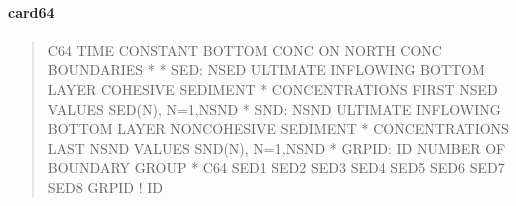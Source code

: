 \documentclass[letterpaper,10pt,english]{sphinxmanual}
\begin{document}
\paragraph{card64}
\label{\detokenize{inputfiles/runcontrol/card64:card64}}\label{\detokenize{inputfiles/runcontrol/card64::doc}}\begin{quote}

\begin{sphinxVerbatim}[commandchars=\\\{\}]
\PYGZhy{}\PYGZhy{}\PYGZhy{}\PYGZhy{}\PYGZhy{}\PYGZhy{}\PYGZhy{}\PYGZhy{}\PYGZhy{}\PYGZhy{}\PYGZhy{}\PYGZhy{}\PYGZhy{}\PYGZhy{}\PYGZhy{}\PYGZhy{}\PYGZhy{}\PYGZhy{}\PYGZhy{}\PYGZhy{}\PYGZhy{}\PYGZhy{}\PYGZhy{}\PYGZhy{}\PYGZhy{}\PYGZhy{}\PYGZhy{}\PYGZhy{}\PYGZhy{}\PYGZhy{}\PYGZhy{}\PYGZhy{}\PYGZhy{}\PYGZhy{}\PYGZhy{}\PYGZhy{}\PYGZhy{}\PYGZhy{}\PYGZhy{}\PYGZhy{}\PYGZhy{}\PYGZhy{}\PYGZhy{}\PYGZhy{}\PYGZhy{}\PYGZhy{}\PYGZhy{}\PYGZhy{}\PYGZhy{}\PYGZhy{}\PYGZhy{}\PYGZhy{}\PYGZhy{}\PYGZhy{}\PYGZhy{}\PYGZhy{}\PYGZhy{}\PYGZhy{}\PYGZhy{}\PYGZhy{}\PYGZhy{}\PYGZhy{}\PYGZhy{}\PYGZhy{}\PYGZhy{}\PYGZhy{}\PYGZhy{}\PYGZhy{}\PYGZhy{}\PYGZhy{}\PYGZhy{}\PYGZhy{}\PYGZhy{}\PYGZhy{}\PYGZhy{}\PYGZhy{}\PYGZhy{}\PYGZhy{}
C64 TIME CONSTANT BOTTOM CONC ON NORTH CONC BOUNDARIES
*
*    SED: NSED ULTIMATE INFLOWING BOTTOM LAYER COHESIVE SEDIMENT
*         CONCENTRATIONS  FIRST NSED VALUES SED(N), N=1,NSND
*    SND: NSND ULTIMATE INFLOWING BOTTOM LAYER NON\PYGZhy{}COHESIVE SEDIMENT
*         CONCENTRATIONS LAST NSND VALUES SND(N), N=1,NSND
*  GRPID: ID NUMBER OF BOUNDARY GROUP
*
C64      SED1      SED2      SED3      SED4      SED5      SED6      SED7      SED8      GRPID ! ID
\end{sphinxVerbatim}
\end{quote}
\end{document}
